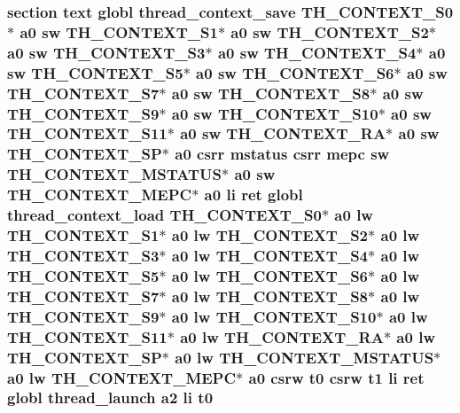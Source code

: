\hypertarget{riscv_2threada_8S_a46d076acc3b53e33d685299a001dd7f0}{
\subsubsection[{t0}]{\setlength{\rightskip}{0pt plus 5cm}section text globl {\bf thread\-\_\-context\-\_\-save} {\bf T\-H\-\_\-\-C\-O\-N\-T\-E\-X\-T\-\_\-\-S0}$\ast$ {\bf a0} {\bf sw} {\bf T\-H\-\_\-\-C\-O\-N\-T\-E\-X\-T\-\_\-\-S1}$\ast$ {\bf a0} {\bf sw} {\bf T\-H\-\_\-\-C\-O\-N\-T\-E\-X\-T\-\_\-\-S2}$\ast$ {\bf a0} {\bf sw} {\bf T\-H\-\_\-\-C\-O\-N\-T\-E\-X\-T\-\_\-\-S3}$\ast$ {\bf a0} {\bf sw} {\bf T\-H\-\_\-\-C\-O\-N\-T\-E\-X\-T\-\_\-\-S4}$\ast$ {\bf a0} {\bf sw} {\bf T\-H\-\_\-\-C\-O\-N\-T\-E\-X\-T\-\_\-\-S5}$\ast$ {\bf a0} {\bf sw} {\bf T\-H\-\_\-\-C\-O\-N\-T\-E\-X\-T\-\_\-\-S6}$\ast$ {\bf a0} {\bf sw} {\bf T\-H\-\_\-\-C\-O\-N\-T\-E\-X\-T\-\_\-\-S7}$\ast$ {\bf a0} {\bf sw} {\bf T\-H\-\_\-\-C\-O\-N\-T\-E\-X\-T\-\_\-\-S8}$\ast$ {\bf a0} {\bf sw} {\bf T\-H\-\_\-\-C\-O\-N\-T\-E\-X\-T\-\_\-\-S9}$\ast$ {\bf a0} {\bf sw} {\bf T\-H\-\_\-\-C\-O\-N\-T\-E\-X\-T\-\_\-\-S10}$\ast$ {\bf a0} {\bf sw} {\bf T\-H\-\_\-\-C\-O\-N\-T\-E\-X\-T\-\_\-\-S11}$\ast$ {\bf a0} {\bf sw} {\bf T\-H\-\_\-\-C\-O\-N\-T\-E\-X\-T\-\_\-\-R\-A}$\ast$ {\bf a0} {\bf sw} {\bf T\-H\-\_\-\-C\-O\-N\-T\-E\-X\-T\-\_\-\-S\-P}$\ast$ {\bf a0} csrr {\bf mstatus} csrr {\bf mepc} {\bf sw} {\bf T\-H\-\_\-\-C\-O\-N\-T\-E\-X\-T\-\_\-\-M\-S\-T\-A\-T\-U\-S}$\ast$ {\bf a0} {\bf sw} {\bf T\-H\-\_\-\-C\-O\-N\-T\-E\-X\-T\-\_\-\-M\-E\-P\-C}$\ast$ {\bf a0} {\bf li} ret globl {\bf thread\-\_\-context\-\_\-load} {\bf T\-H\-\_\-\-C\-O\-N\-T\-E\-X\-T\-\_\-\-S0}$\ast$ {\bf a0} {\bf lw} {\bf T\-H\-\_\-\-C\-O\-N\-T\-E\-X\-T\-\_\-\-S1}$\ast$ {\bf a0} {\bf lw} {\bf T\-H\-\_\-\-C\-O\-N\-T\-E\-X\-T\-\_\-\-S2}$\ast$ {\bf a0} {\bf lw} {\bf T\-H\-\_\-\-C\-O\-N\-T\-E\-X\-T\-\_\-\-S3}$\ast$ {\bf a0} {\bf lw} {\bf T\-H\-\_\-\-C\-O\-N\-T\-E\-X\-T\-\_\-\-S4}$\ast$ {\bf a0} {\bf lw} {\bf T\-H\-\_\-\-C\-O\-N\-T\-E\-X\-T\-\_\-\-S5}$\ast$ {\bf a0} {\bf lw} {\bf T\-H\-\_\-\-C\-O\-N\-T\-E\-X\-T\-\_\-\-S6}$\ast$ {\bf a0} {\bf lw} {\bf T\-H\-\_\-\-C\-O\-N\-T\-E\-X\-T\-\_\-\-S7}$\ast$ {\bf a0} {\bf lw} {\bf T\-H\-\_\-\-C\-O\-N\-T\-E\-X\-T\-\_\-\-S8}$\ast$ {\bf a0} {\bf lw} {\bf T\-H\-\_\-\-C\-O\-N\-T\-E\-X\-T\-\_\-\-S9}$\ast$ {\bf a0} {\bf lw} {\bf T\-H\-\_\-\-C\-O\-N\-T\-E\-X\-T\-\_\-\-S10}$\ast$ {\bf a0} {\bf lw} {\bf T\-H\-\_\-\-C\-O\-N\-T\-E\-X\-T\-\_\-\-S11}$\ast$ {\bf a0} {\bf lw} {\bf T\-H\-\_\-\-C\-O\-N\-T\-E\-X\-T\-\_\-\-R\-A}$\ast$ {\bf a0} {\bf lw} {\bf T\-H\-\_\-\-C\-O\-N\-T\-E\-X\-T\-\_\-\-S\-P}$\ast$ {\bf a0} {\bf lw} {\bf T\-H\-\_\-\-C\-O\-N\-T\-E\-X\-T\-\_\-\-M\-S\-T\-A\-T\-U\-S}$\ast$ {\bf a0} {\bf lw} {\bf T\-H\-\_\-\-C\-O\-N\-T\-E\-X\-T\-\_\-\-M\-E\-P\-C}$\ast$ {\bf a0} csrw t0 csrw {\bf t1} {\bf li} ret globl {\bf thread\-\_\-launch} {\bf a2} {\bf li} t0}}\label{riscv_2threada_8S_a46d076acc3b53e33d685299a001dd7f0}
